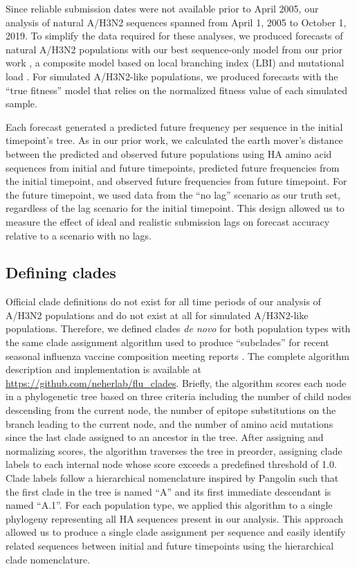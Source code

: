 \documentclass[9pt,lineno]{elife}
\begin{document}
Since reliable submission dates were not available prior to April 2005, our analysis of natural A/H3N2 sequences spanned from April 1, 2005 to October 1, 2019.
To simplify the data required for these analyses, we produced forecasts of natural A/H3N2 populations with our best sequence-only model from our prior work \citep{Huddleston2020}, a composite model based on local branching index (LBI) \citep{Neher:2014eu} and mutational load \citep{Luksza:2014hj}.
For simulated A/H3N2-like populations, we produced forecasts with the ``true fitness'' model that relies on the normalized fitness value of each simulated sample.

Each forecast generated a predicted future frequency per sequence in the initial timepoint's tree.
As in our prior work, we calculated the earth mover's distance \citep{Rubner1998} between the predicted and observed future populations using HA amino acid sequences from initial and future timepoints, predicted future frequencies from the initial timepoint, and observed future frequencies from future timepoint.
For the future timepoint, we used data from the ``no lag'' scenario as our truth set, regardless of the lag scenario for the initial timepoint.
This design allowed us to measure the effect of ideal and realistic submission lags on forecast accuracy relative to a scenario with no lags.

\subsection{Defining clades}

Official clade definitions do not exist for all time periods of our analysis of A/H3N2 populations and do not exist at all for simulated A/H3N2-like populations.
Therefore, we defined clades \emph{de novo} for both population types with the same clade assignment algorithm used to produce ``subclades'' for recent seasonal influenza vaccine composition meeting reports \citep{Huddleston2024}.
The complete algorithm description and implementation is available at \url{https://github.com/neherlab/flu_clades}.
Briefly, the algorithm scores each node in a phylogenetic tree based on three criteria including the number of child nodes descending from the current node, the number of epitope substitutions on the branch leading to the current node, and the number of amino acid mutations since the last clade assigned to an ancestor in the tree.
After assigning and normalizing scores, the algorithm traverses the tree in preorder, assigning clade labels to each internal node whose score exceeds a predefined threshold of 1.0.
Clade labels follow a hierarchical nomenclature inspired by Pangolin \citep{OToole2021} such that the first clade in the tree is named ``A'' and its first immediate descendant is named ``A.1''.
For each population type, we applied this algorithm to a single phylogeny representing all HA sequences present in our analysis.
This approach allowed us to produce a single clade assignment per sequence and easily identify related sequences between initial and future timepoints using the hierarchical clade nomenclature.
\end{document}
